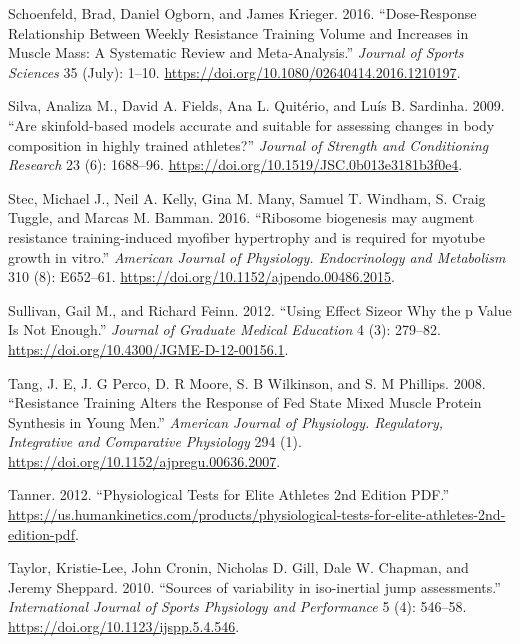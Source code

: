 \documentclass[
  letterpaper,
  DIV=11,
  numbers=noendperiod]{scrreprt}
\newlength{\cslhangindent}
\newlength{\cslentryspacingunit} %
\newenvironment{CSLReferences}[2] %
 {%
  \setlength{\parindent}{0pt}
  \ifodd #1
  \let\oldpar\par
  \def\par{\hangindent=\cslhangindent\oldpar}
  \fi
  \setlength{\parskip}{#2\cslentryspacingunit}
 }%
 {}
\begin{document}
\begin{CSLReferences}{1}{0}
\leavevmode{}%
Schoenfeld, Brad, Daniel Ogborn, and James Krieger. 2016.
{``Dose-Response Relationship Between Weekly Resistance Training Volume
and Increases in Muscle Mass: A Systematic Review and Meta-Analysis.''}
\emph{Journal of Sports Sciences} 35 (July): 1--10.
\url{https://doi.org/10.1080/02640414.2016.1210197}.

\leavevmode{}%
Silva, Analiza M., David A. Fields, Ana L. Quitério, and Luís B.
Sardinha. 2009. {``Are skinfold-based models accurate and suitable for
assessing changes in body composition in highly trained athletes?''}
\emph{Journal of Strength and Conditioning Research} 23 (6): 1688--96.
\url{https://doi.org/10.1519/JSC.0b013e3181b3f0e4}.

\leavevmode{}%
Stec, Michael J., Neil A. Kelly, Gina M. Many, Samuel T. Windham, S.
Craig Tuggle, and Marcas M. Bamman. 2016. {``Ribosome biogenesis may
augment resistance training-induced myofiber hypertrophy and is required
for myotube growth in vitro.''} \emph{American Journal of Physiology.
Endocrinology and Metabolism} 310 (8): E652--61.
\url{https://doi.org/10.1152/ajpendo.00486.2015}.

\leavevmode{}%
Sullivan, Gail M., and Richard Feinn. 2012. {``Using Effect
Size{\textemdash}or Why the p Value Is Not Enough.''} \emph{Journal of
Graduate Medical Education} 4 (3): 279--82.
\url{https://doi.org/10.4300/JGME-D-12-00156.1}.

\leavevmode{}%
Tang, J. E, J. G Perco, D. R Moore, S. B Wilkinson, and S. M Phillips.
2008. {``Resistance Training Alters the Response of Fed State Mixed
Muscle Protein Synthesis in Young Men.''} \emph{American Journal of
Physiology. Regulatory, Integrative and Comparative Physiology} 294 (1).
\url{https://doi.org/10.1152/ajpregu.00636.2007}.

\leavevmode{}%
Tanner. 2012. {``Physiological Tests for Elite Athletes 2nd Edition
PDF.''}
\url{https://us.humankinetics.com/products/physiological-tests-for-elite-athletes-2nd-edition-pdf}.

\leavevmode{}%
Taylor, Kristie-Lee, John Cronin, Nicholas D. Gill, Dale W. Chapman, and
Jeremy Sheppard. 2010. {``Sources of variability in iso-inertial jump
assessments.''} \emph{International Journal of Sports Physiology and
Performance} 5 (4): 546--58.
\url{https://doi.org/10.1123/ijspp.5.4.546}.


\end{CSLReferences}
\end{document}
